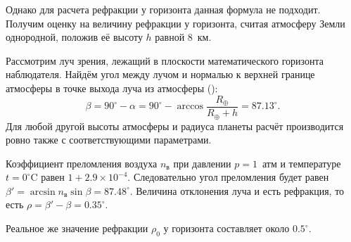 Однако для расчета рефракции у горизонта данная формула не подходит. Получим оценку на величину рефракции у горизонта, считая атмосферу Земли однородной, положив её высоту $h$ равной 8~км. 

Рассмотрим луч зрения, лежащий в плоскости математического горизонта наблюдателя. Найдём угол между лучом и нормалью к верхней границе атмосферы в точке выхода луча из атмосферы ():
\begin{equation*}
    \beta = 90^\circ - \alpha = 90^\circ - \arccos \frac{R_\oplus}{R_\oplus + h} = 87.13^\circ.
\end{equation*}
Для любой другой высоты атмосферы и радиуса планеты расчёт производится ровно также с соответствующими параметрами.

Коэффициент преломления воздуха $n_\text{в}$ при давлении $p = 1$~атм и температуре $t=0^\circ\text{C}$ равен $1 + 2.9\times 10^{-4}$. Следовательно угол преломления будет равен $\beta' = \arcsin n_\text{в} \sin \beta = 87.48^\circ$. Величина отклонения луча и есть рефракция, то есть $\rho = \beta' - \beta = 0.35^\circ$.

Реальное же значение рефракции $\rho_0$ у горизонта составляет около $0.5^\circ$.

